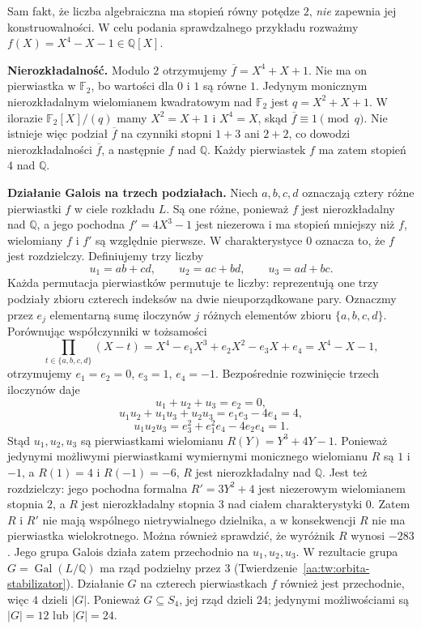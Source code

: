\begin{uwaga}\label{aa:uw:constructibility-degree-not-sufficient}
Sam fakt, że liczba algebraiczna ma stopień równy potędze $2$,
\emph{nie} zapewnia jej konstruowalności. W celu podania
sprawdzalnego przykładu rozważmy
$f(X)=X^4-X-1\in\mathbb Q[X]$.

\textbf{Nierozkładalność.}
Modulo $2$ otrzymujemy $\overline f=X^4+X+1$.
Nie ma on pierwiastka w $\mathbb F_2$, bo wartości
dla $0$ i $1$ są równe $1$. Jedynym monicznym
nierozkładalnym wielomianem kwadratowym nad
$\mathbb F_2$ jest $q=X^2+X+1$.
W ilorazie $\mathbb F_2[X]/(q)$ mamy $X^2=X+1$
i $X^4=X$, skąd $\overline f\equiv1\pmod q$.
Nie istnieje więc podział $\overline f$ na czynniki
stopni $1+3$ ani $2+2$, co dowodzi nierozkładalności
$\overline f$, a następnie $f$ nad $\mathbb Q$.
Każdy pierwiastek $f$ ma zatem stopień $4$ nad $\mathbb Q$.

\textbf{Działanie Galois na trzech podziałach.}
Niech $a,b,c,d$ oznaczają cztery różne pierwiastki
$f$ w ciele rozkładu $L$. Są one różne,
ponieważ $f$ jest nierozkładalny nad $\mathbb Q$,
a jego pochodna $f'=4X^3-1$ jest niezerowa i ma stopień
mniejszy niż $f$, wielomiany $f$ i $f'$ są względnie
pierwsze. W charakterystyce $0$ oznacza to, że $f$
jest rozdzielczy.
Definiujemy trzy liczby
\[
 u_1=ab+cd,\qquad u_2=ac+bd,\qquad u_3=ad+bc.
\]
Każda permutacja pierwiastków permutuje te liczby:
reprezentują one trzy podziały zbioru czterech
indeksów na dwie nieuporządkowane pary.
Oznaczmy przez $e_j$ elementarną sumę iloczynów
$j$ różnych elementów zbioru $\{a,b,c,d\}$.
Porównując współczynniki w tożsamości
\[
\prod_{t\in\{a,b,c,d\}}(X-t)
=X^4-e_1X^3+e_2X^2-e_3X+e_4=X^4-X-1,
\]
otrzymujemy $e_1=e_2=0$, $e_3=1$, $e_4=-1$.
Bezpośrednie rozwinięcie trzech iloczynów daje
\[
 u_1+u_2+u_3=e_2=0,
\]
\[
 u_1u_2+u_1u_3+u_2u_3=e_1e_3-4e_4=4,
\]
\[
 u_1u_2u_3=e_3^2+e_1^2e_4-4e_2e_4=1.
\]
Stąd $u_1,u_2,u_3$ są pierwiastkami wielomianu
$R(Y)=Y^3+4Y-1$. Ponieważ jedynymi możliwymi
pierwiastkami wymiernymi monicznego wielomianu
$R$ są $1$ i $-1$, a $R(1)=4$ i $R(-1)=-6$,
$R$ jest nierozkładalny nad $\mathbb Q$.
Jest też rozdzielczy: jego pochodna formalna
$R'=3Y^2+4$ jest niezerowym wielomianem stopnia $2$,
a $R$ jest nierozkładalny stopnia $3$ nad ciałem
charakterystyki $0$. Zatem $R$ i $R'$ nie mają
wspólnego nietrywialnego dzielnika, a w konsekwencji
$R$ nie ma pierwiastka wielokrotnego.
Można również sprawdzić, że wyróżnik $R$ wynosi $-283$.
Jego grupa Galois działa zatem przechodnio na
$u_1,u_2,u_3$. W rezultacie grupa
$G=\operatorname{Gal}(L/\mathbb Q)$ ma rząd
podzielny przez $3$ (Twierdzenie~\ref{aa:tw:orbita-stabilizator}).
Działanie $G$ na czterech pierwiastkach $f$
również jest przechodnie, więc $4$ dzieli $|G|$.
Ponieważ $G\subseteq S_4$, jej rząd dzieli $24$;
jedynymi możliwościami są $|G|=12$ lub $|G|=24$.


\end{uwaga}
